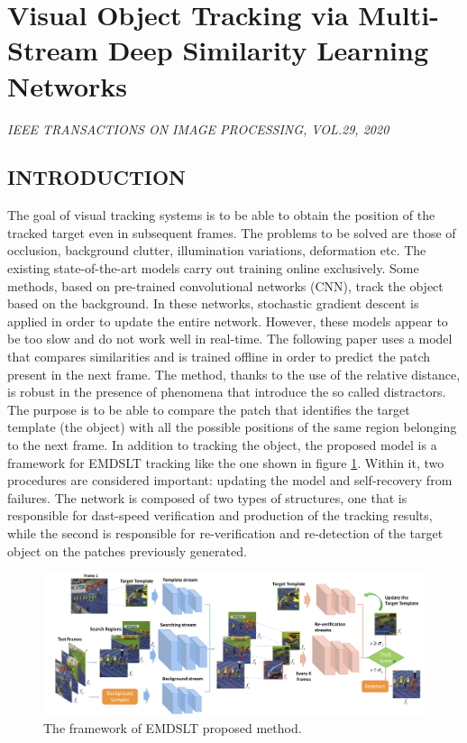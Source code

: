 \section{Visual Object Tracking via Multi-Stream Deep Similarity Learning Networks}

\begin{center}
    \author{
    Kunpeng Li,
    \emph{Student Member, IEEE},
    Yu Kong,
    \emph{Member, IEEE},
    Yunf Fu,
    \emph{Fellow, IEEE}
    }
\end{center}

\begin{center}
    \emph{IEEE TRANSACTIONS ON IMAGE PROCESSING, VOL.29, 2020}
\end{center}

\subsection{INTRODUCTION}
The goal of visual tracking systems is to be able to obtain the position of 
the tracked target even in subsequent frames. The problems to be solved are 
those of occlusion, background clutter, illumination variations, deformation 
etc. The existing state-of-the-art models carry out training online exclusively. 
Some methods, based on pre-trained convolutional networks (CNN), track 
the object based on the background. In these networks, stochastic gradient 
descent is applied in order to update the entire network. However, these 
models appear to be too slow and do not work well in real-time. The following 
paper uses a model that compares similarities and is trained offline in order to 
predict the patch present in the next frame. The method, thanks to the use of 
the relative distance, is robust in the presence of phenomena that introduce 
the so called distractors. The purpose is to be able to compare the patch that 
identifies the target template (the object) with all the possible positions 
of the same region belonging to the next frame. In addition to tracking the 
object, the proposed model is a framework for EMDSLT tracking like the 
one shown in figure \ref{fig:EMDSLT}. Within it, two procedures are considered important: 
updating the model and self-recovery from failures. The network is composed 
of two types of structures, one that is responsible for dast-speed verification 
and production of the tracking results, while the second is responsible for re-verification 
and re-detection of the target object on the patches previously 
generated.
\begin{figure}[h!]
    \centering
    \includegraphics[width = \linewidth]{images/paper8/EMDSLT.png}
    \centering
    \caption{The framework of EMDSLT proposed method.}
    \label{fig:EMDSLT}
\end{figure}

